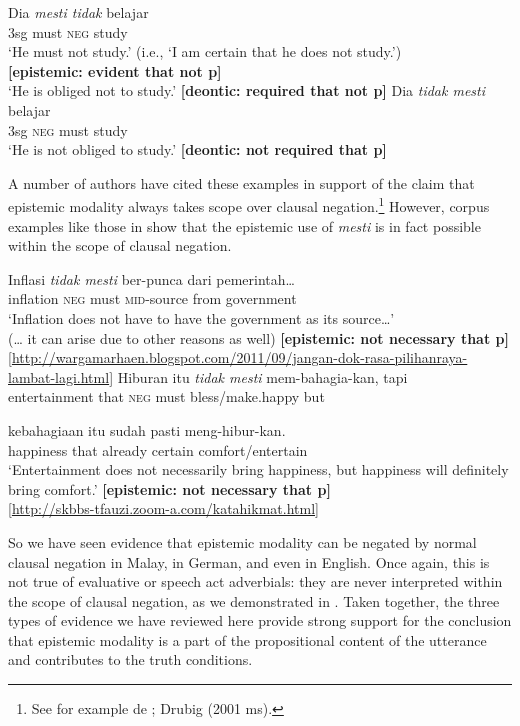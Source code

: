\ea
\ea \gll Dia  \textit{mesti  tidak}  belajar\\
3sg  must  \textsc{neg}  study\\
\glt ‘He must not study.’ (i.e., ‘I am certain that he does not study.’)\\
        \textbf{[epistemic: evident that not p]}\\
‘He is obliged not to study.’  \textbf{[deontic: required that not p]}
\ex \gll Dia  \textit{tidak  mesti}  belajar\\
3sg  \textsc{neg}  must  study\\
\glt ‘He is not obliged to study.’  \textbf{[deontic: not required that p]}
\z \z


A number of authors have cited these examples in support of the claim that epistemic modality always takes scope over clausal negation.\footnote{See for example de \citet{Haan1997}; Drubig (2001 ms).} However, corpus examples like those in  show that the epistemic use of \textit{mesti} is in fact possible within the scope of clausal negation.


\ea
\ea \gll Inflasi  \textit{tidak  mesti}  ber-punca  dari  pemerintah…\\
inflation  \textsc{neg}  must  \textsc{mid}-source  from  government\\
\glt ‘Inflation does not have to have the government as its source…’\\
(… it can arise due to other reasons as well)      \textbf{[epistemic: not necessary that p]}\\
{}[\url{http://wargamarhaen.blogspot.com/2011/09/jangan-dok-rasa-pilihanraya-lambat-lagi.html}]
\ex \gll  Hiburan  itu  \textit{tidak  mesti}  mem-bahagia-kan,  tapi\\
entertainment  that  \textsc{neg}  must  bless/make.happy  but\\
\z \z

\ea
  \gll kebahagiaan  itu  sudah  pasti  meng-hibur-kan.\\
happiness  that  already  certain  comfort/entertain\\
\glt ‘Entertainment does not necessarily bring happiness, but happiness will definitely bring comfort.’          \textbf{[epistemic: not necessary that p]}\\
{}[\url{http://skbbs-tfauzi.zoom-a.com/katahikmat.html}]
\z


So we have seen evidence that epistemic modality can be negated by normal clausal negation in Malay, in German, and even in English. Once again, this is not true of evaluative or speech act adverbials: they are never interpreted within the scope of clausal negation, as we demonstrated in . Taken together, the three types of evidence we have reviewed here provide strong support for the conclusion that epistemic modality is a part of the propositional content of the utterance and contributes to the truth conditions.


